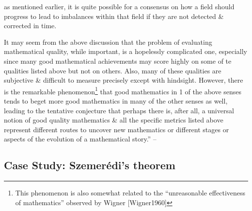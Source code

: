 \documentclass[oneside]{book}
\numberwithin{equation}{section}
\begin{document}
as mentioned earlier, it is quite possible for a consensus on how a field should progress to lead to imbalances within that field if they are not detected \& corrected in time.

It may seem from the above discussion that the problem of evaluating mathematical quality, while important, is a hopelessly complicated one, especially since many good mathematical achievements may score highly on some of te qualities listed above but not on others. Also, many of these qualities are subjective \& difficult to measure precisely except with hindsight. However, there is the remarkable phenomenon\footnote{This phenomenon is also somewhat related to the ``unreasonable effectiveness of mathematics'' observed by Wigner [Wigner1960]} that good mathematics in 1 of the above senses tends to beget more good mathematics in many of the other senses as well, leading to the tentative conjecture that perhaps there is, after all, a universal notion of good quality mathematics \& all the specific metrics listed above represent different routes to uncover new mathematics or different stages or aspects of the evolution of a mathematical story.'' -- \cite[pp. 623--626]{Tao2007}

\subsection{Case Study: Szemer\'edi's theorem}


\printbibliography[heading=bibintoc]
	
\end{document}

